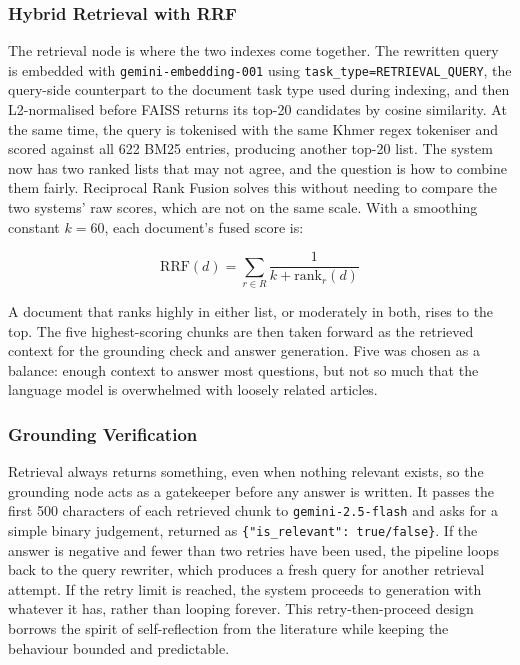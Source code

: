 \subsubsection*{Hybrid Retrieval with RRF}

\hs The retrieval node is where the two indexes come together. The rewritten query is
embedded with \texttt{gemini-embedding-001} using
\texttt{task\_type=RETRIEVAL\_QUERY}, the query-side counterpart to the document task
type used during indexing, and then L2-normalised before FAISS returns its top-20
candidates by cosine similarity. At the same time, the query is tokenised with the same
Khmer regex tokeniser and scored against all 622 BM25 entries, producing another top-20
list. The system now has two ranked lists that may not agree, and the question is how to
combine them fairly. Reciprocal Rank Fusion solves this without needing to compare the
two systems' raw scores, which are not on the same scale. With a smoothing constant
$k = 60$, each document's fused score is:

\begin{equation}
\text{RRF}(d) = \sum_{r \in R} \frac{1}{k + \text{rank}_r(d)}
\end{equation}

\hs A document that ranks highly in either list, or moderately in both, rises to the
top. The five highest-scoring chunks are then taken forward as the retrieved context for
the grounding check and answer generation. Five was chosen as a balance: enough context
to answer most questions, but not so much that the language model is overwhelmed with
loosely related articles.

\subsubsection*{Grounding Verification}

\hs Retrieval always returns something, even when nothing relevant exists, so the
grounding node acts as a gatekeeper before any answer is written. It passes the first 500
characters of each retrieved chunk to \texttt{gemini-2.5-flash} and asks for a simple
binary judgement, returned as \texttt{\{"is\_relevant": true/false\}}. If the answer is
negative and fewer than two retries have been used, the pipeline loops back to the query
rewriter, which produces a fresh query for another retrieval attempt. If the retry limit
is reached, the system proceeds to generation with whatever it has, rather than looping
forever. This retry-then-proceed design borrows the spirit of self-reflection from the
literature while keeping the behaviour bounded and predictable.

